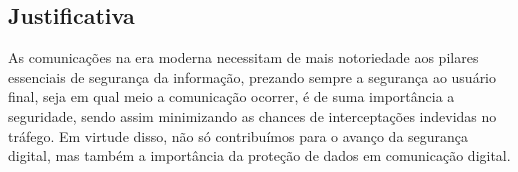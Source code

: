 
\subsection{Justificativa}

As comunicações na era moderna necessitam de mais notoriedade aos
pilares essenciais de segurança da informação, prezando sempre a
segurança ao usuário final, seja em qual meio a comunicação ocorrer,
é de suma importância a seguridade, sendo assim minimizando as
chances de interceptações indevidas no tráfego. Em virtude disso, não
só contribuímos para o avanço da segurança digital, mas também a
importância da proteção de dados em comunicação digital.

\newpage
